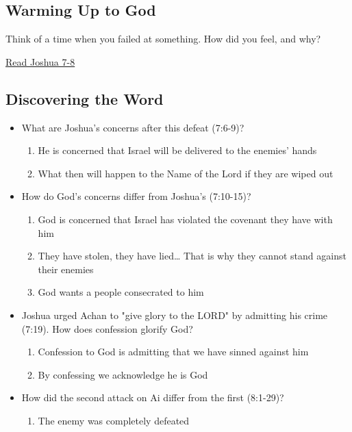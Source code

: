 \documentclass[11pt]{article}
\begin{document}
\subsection{Warming Up to God}
\label{sec:orgfd94abf}

Think of a time when you failed at something. How did you feel, and why?

\href{https://www.biblegateway.com/passage/?search=Joshua\%207-8\&version=NIV\&interface=print}{Read Joshua 7-8}

\subsection{Discovering the Word}
\label{sec:orgc32da58}

\begin{itemize}
\item What are Joshua's concerns after this defeat (7:6-9)?
\begin{enumerate}
\item He is concerned that Israel will be delivered to the enemies' hands
\item What then will happen to the Name of the Lord if they are wiped out
\end{enumerate}

\item How do God's concerns differ from Joshua's (7:10-15)?
\begin{enumerate}
\item God is concerned that Israel has violated the covenant they have
with him

\item They have stolen, they have lied\ldots{} That is why they cannot stand
against their enemies

\item God wants a people consecrated to him
\end{enumerate}

\item Joshua urged Achan to "give glory to the LORD" by admitting his
crime (7:19). How does confession glorify God?
\begin{enumerate}
\item Confession to God is admitting that we have sinned against him

\item By confessing we acknowledge he is God
\end{enumerate}

\item How did the second attack on Ai differ from the first (8:1-29)?
\begin{enumerate}
\item The enemy was completely defeated
\end{enumerate}


\end{itemize}
\end{document}
